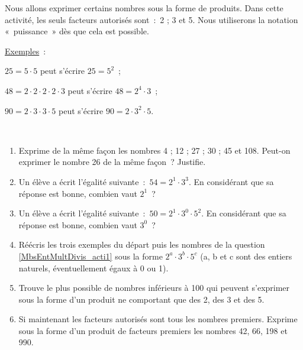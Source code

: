 \begin{activite}

Nous allons exprimer certains nombres sous la forme de produits. Dans cette activité, les seuls facteurs autorisés sont : 2 ; 3 et 5. Nous utiliserons la notation « puissance » dès que cela est possible.\\[0.25em]

 \begin{minipage}[t]{0.1\linewidth}
 \underline{Exemples} : 
  \end{minipage} \hfill%
 \begin{minipage}[t]{0.86\linewidth}
$25 = 5 \cdot 5$ peut s'écrire $25 = 5^2$ ;

$48 = 2 \cdot 2 \cdot 2 \cdot 2 \cdot 3$ peut s'écrire $48 = 2^4 \cdot 3$ ;

$90 = 2 \cdot 3 \cdot 3 \cdot 5$ peut s'écrire $90 = 2 \cdot 3^2 \cdot 5$.
 \end{minipage} \\

\begin{enumerate}
 \item Exprime de la même façon les nombres 4 ; 12 ; 27 ; 30 ; 45 et 108. Peut-on exprimer le nombre 26 de la même façon ? Justifie. \label{MbsEntMultDivis_acti1}
 \item Un élève a écrit l'égalité suivante : $54 = 2^1 \cdot 3^3$. En considérant que sa réponse est bonne, combien vaut $2^1$ ?
 \item Un élève a écrit l'égalité suivante : $50 = 2^1 \cdot 3^0 \cdot 5^2$. En considérant que sa réponse est bonne, combien vaut $3^0$ ?
 \item Réécris les trois exemples du départ puis les nombres de la question \ref{MbsEntMultDivis_acti1} sous la forme  $2^a \cdot 3^b \cdot 5^c$ (a, b et c sont des entiers naturels, éventuellement égaux à 0 ou 1).
 \item Trouve le plus possible de nombres inférieurs à 100 qui peuvent s'exprimer sous la forme d'un produit ne comportant que des 2, des 3 et des 5.
 \item Si maintenant les facteurs autorisés sont tous les nombres premiers. Exprime sous la forme d'un produit de facteurs premiers les nombres 42, 66, 198 et 990.
 \end{enumerate}
 
\end{activite}
